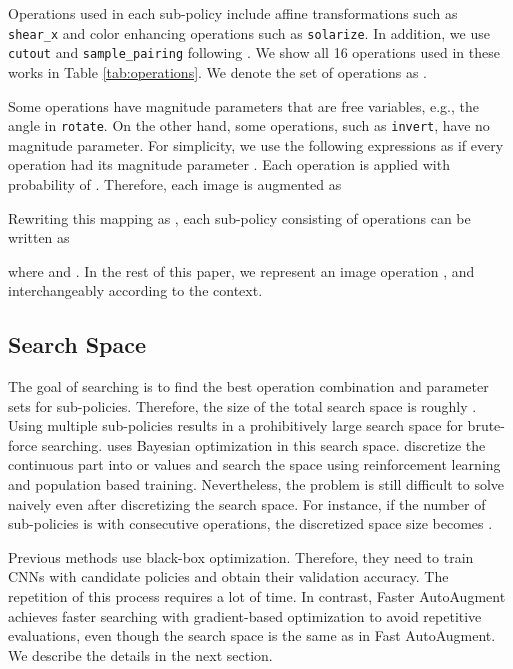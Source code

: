 \documentclass[10pt,twocolumn,letterpaper]{article}
\newcommand{\Tabref}[1]{Table \ref{#1}}
\newcommand{\autoaugment}{AutoAugment\xspace}
\newcommand{\faster}{Faster \autoaugment}
\newcommand{\fast}{Fast \autoaugment}
\begin{document}
Operations used in each sub-policy include affine transformations such as \texttt{shear\_x} and color enhancing operations such as \texttt{solarize}. In addition, we use \texttt{cutout} \cite{DeVries2017} and \texttt{sample\_pairing} \cite{Inoue} following \cite{Cubuk2018,Ho2019,Lim2019}. We show all 16 operations used in these works in \Tabref{tab:operations}. We denote the set of operations as .

Some operations have magnitude parameters that are free variables, e.g., the angle in \texttt{rotate}. On the other hand, some operations, such as \texttt{invert}, have no magnitude parameter. For simplicity, we use the following expressions as if every operation had its magnitude parameter . Each operation is applied with probability of . Therefore, each image  is augmented as



Rewriting this mapping as , each sub-policy  consisting of operations  can be written as



\noindent where  and . In the rest of this paper, we represent an image operation ,  and  interchangeably according to the context.

\subsection{Search Space}\label{sub:search_space}

The goal of searching is to find the best operation combination  and parameter sets  for  sub-policies. Therefore, the size of the total search space is roughly . Using multiple sub-policies results in a prohibitively large search space for brute-force searching. \cite{Lim2019} uses Bayesian optimization in this search space. \cite{Cubuk2018,Ho2019} discretize the continuous part  into  or  values and search the space using reinforcement learning and population based training. Nevertheless, the problem is still difficult to solve naively even after discretizing the search space. For instance, if the number of sub-policies  is  with  consecutive operations, the discretized space size becomes . 

Previous methods \cite{Cubuk2018,Ho2019,Lim2019} use black-box optimization. Therefore, they need to train CNNs with candidate policies and obtain their validation accuracy. The repetition of this process requires a lot of time. In contrast, \faster achieves faster searching with gradient-based optimization to avoid repetitive evaluations, even though the search space is the same as in \fast. We describe the details in the next section.
\end{document}
